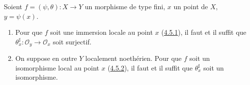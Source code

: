 \begin{proposition}[6.5.4]
\label{I.6.5.4-fr}
Soient $f=(\psi,\theta):X\to Y$ un morphisme de type fini, $x$ un point de
$X$, $y=\psi(x)$.
\begin{enumerate}
  \item[\textup{(i)}] Pour que $f$ soit une immersion locale au point $x$
    \textup{(\hyperref[I.4.5.1-fr]{4.5.1})}, il faut et il suffit que
    $\theta_x^\sharp:\mathscr{O}_y\to\mathscr{O}_x$ soit surjectif.
  \item[\textup{(ii)}] On suppose en outre $Y$ localement noethérien. Pour que $f$ soit
    un isomorphisme local au point $x$
    \textup{(\hyperref[I.4.5.2-fr]{4.5.2})}, il faut et il suffit que
    $\theta_x^\sharp$ soit un isomorphisme.
\end{enumerate}
\end{proposition}

